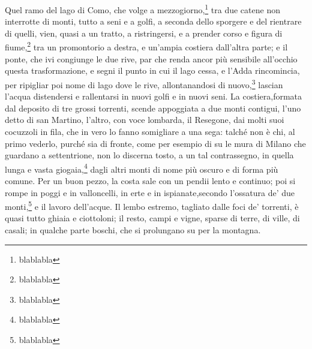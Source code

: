 \documentclass[b5paper]{book}
\begin{document}
Quel ramo del lago di Como, che volge a mezzogiorno,\footnote{blablabla} tra due catene non interrotte di monti, tutto a seni e a golfi, a seconda dello sporgere e del rientrare di quelli, vien, quasi a un tratto, a ristringersi, e a prender corso e figura di fiume,\footnote{blablabla} tra un promontorio a destra, e un’ampia costiera dall’altra parte; e il ponte, che ivi congiunge le due rive, par che renda ancor più sensibile all’occhio questa trasformazione, e segni il punto in cui il lago cessa, e l’Adda rincomincia, per ripigliar poi nome di lago dove le rive, allontanandosi di nuovo,\footnote{blablabla} lascian l’acqua distendersi e rallentarsi in nuovi golfi e in nuovi seni. La costiera,formata dal deposito di tre grossi torrenti, scende appoggiata a due monti contigui, l’uno detto di san Martino, l’altro, con voce lombarda, il Resegone, dai molti suoi cocuzzoli in fila, che in vero lo fanno somigliare a una sega: talché non è chi, al primo vederlo, purché sia di fronte, come per esempio di su le mura di Milano che guardano a settentrione, non lo discerna tosto, a un tal contrassegno, in quella lunga e vasta giogaia,\footnote{blablabla} dagli altri monti di nome più oscuro e di forma più comune. Per un buon pezzo, la costa sale con un pendii lento e continuo; poi si rompe in poggi e in valloncelli, in erte e in ispianate,secondo l’ossatura de’ due monti,\footnote{blablabla} e il lavoro dell’acque. Il lembo estremo, tagliato dalle foci de’ torrenti, è quasi tutto ghiaia e ciottoloni; il resto, campi e vigne, sparse di terre, di ville, di casali; in qualche parte boschi, che si prolungano su per la montagna. 
\end{document}
